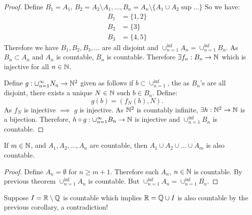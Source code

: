 \begin{proof}
	Define $B_1 = A_1$, $B_2 = A_2 \setminus A_1, \ldots, B_n = A_n \setminus \{A_1 \cup A_2 \sup \ldots\} $ So we have:
	\begin{align}
		B_{1} &= \{1, 2\} \\
		B_2   &= \{3\} \\
		B_3   &= \{4, 5\} 
	\end{align}
	Therefore we have $B_1, B_2, B_3, \ldots$ are all disjoint and $\cup_{n=1}^{\inf}A_n = \cup_{n=1}^{\inf} B_n$. As $B_n \subset  A_n$ and $A_n$ is countable, $B_n$ is countable. Therefore $\exists f_n : B_n \to \mathbb{N}$ which is injective for all $n \in \mathbb{N}$.

	Define $g: \cup_{n=1}^{\infty}N_n \to \mathbb{N}^{2}$ given as follows if $b \subset \cup_{n=1}^{\inf}$, the as $B_n$'s are all disjoint, there exists a unique $N \in \mathbb{N}$ such  $b \in B_n$. Define:
	\[
	g\left( b \right) = \left( f_N\left( b \right), N \right) 
	.\] 
	As $f_N$ is injective $\implies$ $g$ is injective. As $\mathbb{N}^{2}$ is countably infinite, $\exists h: \mathbb{N}^{2} \to \mathbb{N}$ is a bijection. Therefore, $h \circ g: \cup_{n=1}^{\infty}B_n \to \mathbb{N}$ is injective and $\cup_{n=1}^{\inf}B_n$ is countable.

	

\end{proof}

\begin{theorem}
	If $m \in \mathbb{N}$, and $A_1, A_2, \ldots, A_n$ are countable, then $A_1 \cup A_2\cup \ldots \cup A_m$ is also countable.
\end{theorem}

\begin{proof}
	Define $A_n = \emptyset$ for $n \ge m+1$. Therefore each $A_n$, $n \in \mathbb{N}$ is countable. By previous theorem $\cup_{n=1}^{\inf}A_n$ is countable. But $\cup_{n=1}^{\inf}A_n = \cup_{n=1}^{\inf}B_n$.
\end{proof}

\begin{theorem}
	Suppose $I = \mathbb{R} \setminus \mathbb{Q}$ is countable which implies $\mathbb{R} = \mathbb{Q} \cup I$ is also countable by the previous corollary, a contradiction!
\end{theorem}
















